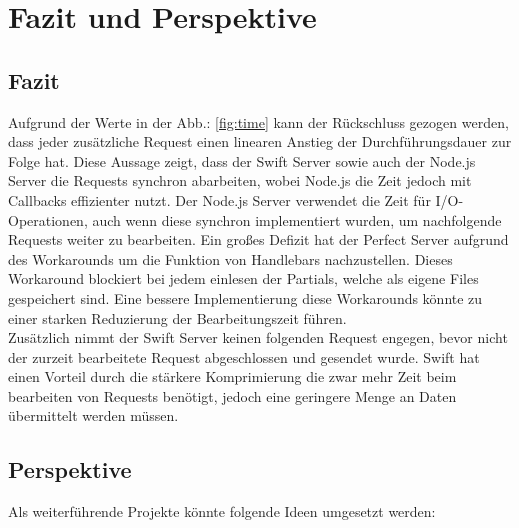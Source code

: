 \chapter{Fazit und Perspektive}\label{chap:conclusion}
\chapterstart

\section{Fazit}

Aufgrund der Werte in der Abb.: \ref{fig:time} kann der Rückschluss gezogen werden, dass jeder zusätzliche Request einen linearen Anstieg der Durchführungsdauer zur Folge hat. Diese Aussage zeigt, dass der Swift Server sowie auch der Node.js Server die Requests synchron abarbeiten, wobei Node.js die Zeit jedoch mit Callbacks effizienter nutzt. Der Node.js Server verwendet die Zeit für I/O-Operationen, auch wenn diese synchron implementiert wurden, um nachfolgende Requests weiter zu bearbeiten. Ein großes Defizit hat der Perfect Server aufgrund des Workarounds um die Funktion von Handlebars nachzustellen. Dieses Workaround blockiert bei jedem einlesen der Partials, welche als eigene Files gespeichert sind. Eine bessere Implementierung diese Workarounds könnte zu einer starken Reduzierung der Bearbeitungszeit führen.\\
Zusätzlich nimmt der Swift Server keinen folgenden Request engegen, bevor nicht der zurzeit bearbeitete Request abgeschlossen und gesendet wurde. Swift hat einen Vorteil durch die stärkere Komprimierung die zwar mehr Zeit beim bearbeiten von Requests benötigt, jedoch eine geringere Menge an Daten übermittelt werden müssen.



\section{Perspektive}

Als weiterführende Projekte könnte folgende Ideen umgesetzt werden:

